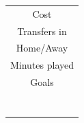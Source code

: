 \begin{table}[H]
\begin{minipage}{.5\textwidth}
\begin{tabular}{c}
Cost                                  \\
Transfers in                          \\
Home/Away                             \\
Minutes played                        \\
Goals                                 \\
\\
\\
\\
\\
\\
\\
\\

 \end{tabular}
\label{tab:sig_var_FWD_1}
\end{minipage}
\end{table}

